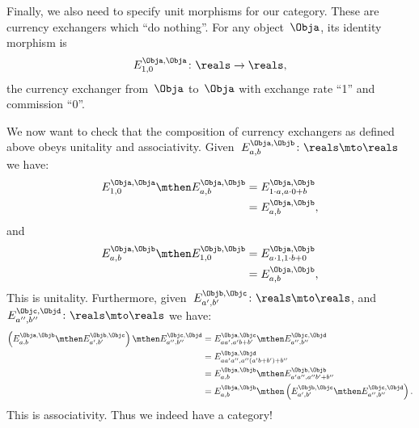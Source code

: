 Finally, we also need to specify unit morphisms for our category.
These are currency exchangers which ``do nothing''.
For any object~$\Obja$, its identity morphism is
\begin{equation*}
    E_{1,0}^{\Obja,\Obja} \colon \reals \to \reals,
\end{equation*}
the currency exchanger from~$\Obja$ to~$\Obja$ with exchange rate ``1'' and commission ``0''.

We now want to check that the composition of currency exchangers as defined above obeys unitality and associativity.
Given~$E_{a,b}^{\Obja,\Objb}\colon \reals \mto \reals$ we have:
\begin{equation*}
    \begin{aligned}
        E_{1,0}^{\Obja,\Obja}\mthen E_{a,b}^{\Obja,\Objb}&=E_{1\cdot a, a\cdot 0+b}^{\Obja,\Objb}\\
        &=E_{a,b}^{\Obja,\Objb},
    \end{aligned}
\end{equation*}
and
\begin{equation*}
    \begin{aligned}
        E_{a,b}^{\Obja,\Objb}\mthen E_{1,0}^{\Objb,\Objb}&=E_{a\cdot 1, 1\cdot b+0}^{\Obja,\Objb}\\
        &=E_{a,b}^{\Obja,\Objb},
    \end{aligned}
\end{equation*}
This is unitality.
Furthermore, given~$E_{a',b'}^{\Objb,\Objc}\colon \reals \mto \reals$, and~$E_{a'',b''}^{\Objc,\Objd}\colon \reals \mto \reals$ we have:
\begin{equation*}
    \begin{aligned}
        \left( E_{a,b}^{\Obja,\Objb}\mthen E_{a',b'}^{\Objb,\Objc}\right)\mthen E_{a'',b''}^{\Objc,\Objd}&=E_{aa',a'b+b'}^{\Obja,\Objc}\mthen E_{a'',b''}^{\Objc,\Objd}\\
        &=E_{aa'a'',a''(a'b+b')+b''}^{\Obja,\Objd}\\
        &=E_{a,b}^{\Obja,\Objb}\mthen E_{a'a'',a''b'+b''}^{\Objb,\Objb}\\
        &=E_{a,b}^{\Obja,\Objb}\mthen \left( E_{a',b'}^{\Objb,\Objc}\mthen E_{a'',b''}^{\Objc,\Objd}\right).
    \end{aligned}
\end{equation*}
This is associativity.
Thus we indeed have a category!


